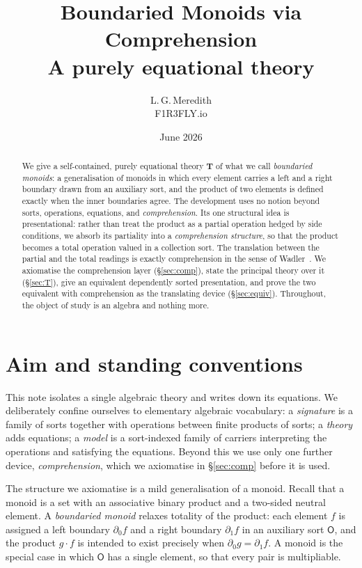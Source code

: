 \documentclass[11pt]{article}
\title{\color{navy}\bfseries Boundaried Monoids via Comprehension\\[2pt]
\normalsize\normalfont\color{black} A purely equational theory}
\author{L.\,G.\,Meredith\\[-1pt]\small F1R3FLY.io}
\date{June 2026}
\theoremstyle{definition}
\theoremstyle{plain}
\newcommand{\Ob}{\mathsf{O}}            %
\newcommand{\dl}{\partial_{0}}          %
\newcommand{\dr}{\partial_{1}}          %
\begin{document}
\maketitle

\begin{abstract}
\noindent
We give a self-contained, purely equational theory $\mathbf{T}$ of what we call
\emph{boundaried monoids}: a generalisation of monoids in which every element
carries a left and a right boundary drawn from an auxiliary sort, and the
product of two elements is defined exactly when the inner boundaries agree.
The development uses no notion beyond sorts, operations, equations, and
\emph{comprehension}. Its one structural idea is presentational: rather than
treat the product as a partial operation hedged by side conditions, we absorb
its partiality into a \emph{comprehension structure}, so that the product
becomes a total operation valued in a collection sort. The translation between
the partial and the total readings is exactly comprehension in the sense of
Wadler~\cite{wadler}. We axiomatise the comprehension layer (\S\ref{sec:comp}),
state the principal theory over it (\S\ref{sec:T}), give an equivalent
dependently sorted presentation, and prove the two equivalent with comprehension
as the translating device (\S\ref{sec:equiv}). Throughout, the object of study
is an algebra and nothing more.
\end{abstract}

\section{Aim and standing conventions}\label{sec:intro}

This note isolates a single algebraic theory and writes down its equations.
We deliberately confine ourselves to elementary algebraic vocabulary: a
\emph{signature} is a family of sorts together with operations between finite
products of sorts; a \emph{theory} adds equations; a \emph{model} is a
sort-indexed family of carriers interpreting the operations and satisfying the
equations. Beyond this we use only one further device, \emph{comprehension},
which we axiomatise in \S\ref{sec:comp} before it is used.

The structure we axiomatise is a mild generalisation of a monoid. Recall that a
monoid is a set with an associative binary product and a two-sided neutral
element. A \emph{boundaried monoid} relaxes totality of the product: each
element $f$ is assigned a left boundary $\dl f$ and a right boundary $\dr f$ in
an auxiliary sort $\Ob$, and the product $g\cdot f$ is intended to exist
precisely when $\dl g=\dr f$. A monoid is the special case in which $\Ob$ has a
single element, so that every pair is multipliable.
\end{document}
